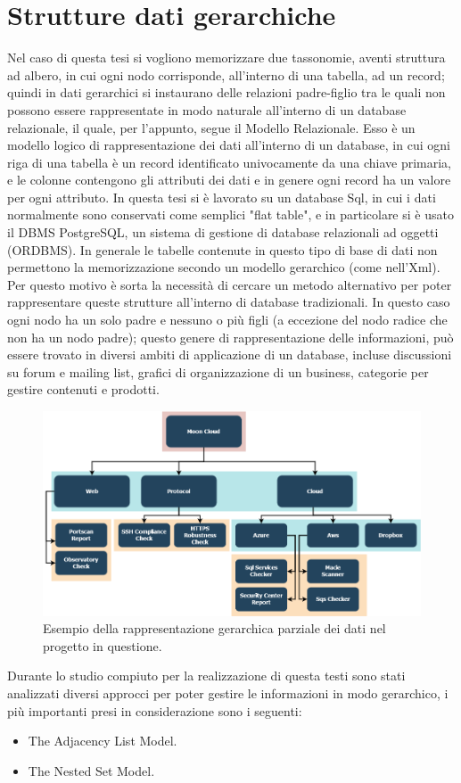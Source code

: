 \section{Strutture dati gerarchiche}
Nel caso di questa tesi si vogliono memorizzare due tassonomie, aventi struttura ad albero, in cui ogni nodo corrisponde, all'interno di una tabella, ad un 
record; quindi in dati gerarchici si instaurano delle relazioni padre-figlio tra le quali non possono essere rappresentate in modo naturale 
all'interno di un database relazionale, il quale, per l'appunto, segue il Modello Relazionale.\hfill\break
Esso è un modello logico di rappresentazione dei dati all'interno di un database, in cui ogni riga di una tabella è un record identificato univocamente
da una chiave primaria, e le colonne contengono gli attributi dei dati e in genere ogni record ha un valore per ogni attributo.\hfill\break
In questa tesi si è lavorato su un database Sql, in cui i dati normalmente sono conservati come semplici "flat table", e in particolare si è usato il DBMS 
PostgreSQL, un sistema di gestione di database relazionali ad oggetti (ORDBMS). In generale le tabelle contenute in questo tipo di base di dati non permettono la 
memorizzazione secondo un modello gerarchico (come nell'Xml).\hfill\break
Per questo motivo è sorta la necessità di cercare un metodo alternativo per poter rappresentare queste strutture all'interno di database tradizionali.
In questo caso ogni nodo ha un solo padre e nessuno o più figli (a eccezione del nodo radice che non ha un nodo padre); questo genere di rappresentazione 
delle informazioni, può essere trovato in diversi ambiti di applicazione di un database, incluse discussioni su forum e mailing list, 
grafici di organizzazione di un business, categorie per gestire contenuti e prodotti.
%
\begin{figure}[ht!]
    \centering
    \includegraphics[scale=0.46]{images/MC_Rec_Tree.png}
    \caption{Esempio della rappresentazione gerarchica parziale dei dati nel progetto in questione.}
    \label{fig:MC_Rec_Tree}
\end{figure}
\hfill\break
Durante lo studio compiuto per la realizzazione di questa testi sono stati analizzati diversi approcci per poter gestire le informazioni in modo gerarchico, 
i più importanti presi in considerazione sono i seguenti: 
\begin{itemize}
    \item The Adjacency List Model.
    \item The Nested Set Model.
\end{itemize}
%

